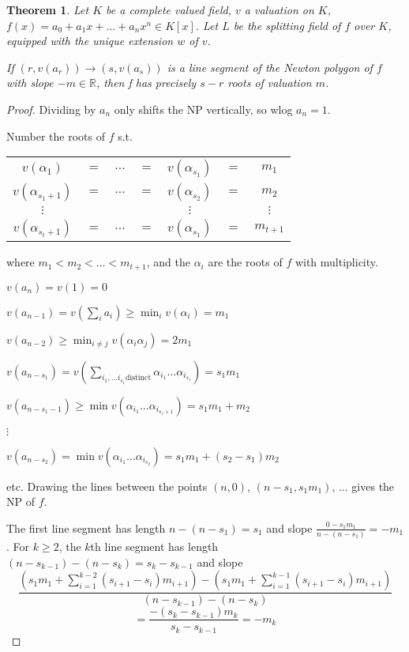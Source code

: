 \documentclass[a4paper]{article}
\newtheorem{theorem}[definition]{Theorem}
\begin{document}
\begin{theorem}
	Let $K$ be a complete valued field,
	$v$ a valuation on $K$,
	$f(x)=a_0 + a_1 x + \dots + a_n x^n \in K[x]$.
	Let $L$ be the splitting field of $f$ over $K$,
	equipped with the unique extension $w$ of $v$.
	
	If $(r, v(a_r)) \to (s, v(a_s))$ is a line segment of the Newton polygon of $f$ with slope $-m \in \mathbb{R}$,
	then f has precisely $s-r$ roots of valuation $m$.
\end{theorem}
\begin{proof}
	Dividing by $a_n$ only shifts the NP vertically,
	so wlog $a_n=1$.
	
	Number the roots of $f$ s.t.
	\begin{center}
	\begin{tabular}{ccccccc}
		$v(\alpha_1)$ & $=$ & $\dots$ & $=$ & $v(\alpha_{s_1})$ & $=$ & $m_1$ \\
		$v(\alpha_{s_1+1})$ & $=$ & $\dots$ & $=$ & $v(\alpha_{s_2})$ & $=$ & $m_2$ \\
		$\vdots$ &  &  & & $\vdots$ & & $\vdots$ \\
		$v(\alpha_{s_t+1})$ & $=$ & $\dots$ & $=$ & $v(\alpha_{s_1})$ & $=$ & $m_{t+1}$ \\
	\end{tabular}
	\end{center}
	where $m_1 < m_2 < \dots < m_{t+1}$, and the $\alpha_i$ are the roots of $f$ with multiplicity.
	
	$v(a_n)=v(1)=0$
	
	$v(a_{n-1}) = v(\sum_i a_i) \geq \min_i v(\alpha_i) = m_1$
	
	$v(a_{n-2}) \geq \min_{i \neq j} v(\alpha_i \alpha_j) = 2m_1$
	
	$v(a_{n-s_1}) = v(\sum_{i_1, \dots i_{s_1} \text{distinct}} \alpha_{i_1}\dots\alpha_{i_{s_1}}) = s_1 m_1$
	
	$v(a_{n-s_1-1}) \geq \min v(\alpha_{i_1}\dots\alpha_{i_{s_1+1}}) = s_1m_1+m_2$
	
	$\vdots$
	
	$v(a_{n-s_2}) =\min v(\alpha_{i_1}\dots\alpha_{i_{s_2}}) = s_1m_1 + (s_2-s_1)m_2$
	
	etc. Drawing the lines between the points $(n, 0)$, $(n-s_1, s_1m_1)$, $\dots$ gives the NP of $f$.
	
	The first line segment has length $n-(n-s_1)=s_1$ and slope $\frac{0-s_1m_1}{n-(n-s_1)} = -m_1$. For $k\geq 2$, the $k$th line segment has length $(n-s_{k-1})-(n-s_k)=s_k-s_{k-1}$ and slope
	$$\frac{(s_1m_1+\sum_{i=1}^{k-2}(s_{i+1}-s_i)m_{i+1}) - (s_1m_1+\sum_{i=1}^{k-1}(s_{i+1}-s_i)m_{i+1})}{(n-s_{k-1})-(n-s_k)}$$
	$$= \frac{-(s_k-s_{k-1})m_k}{s_k - s_{k-1}} = -m_k$$

\end{proof}
\end{document}
